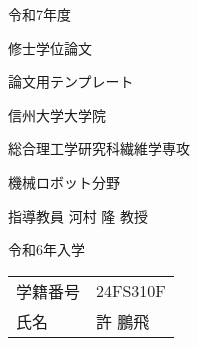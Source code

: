 \documentclass[main]{subfiles}
\begin{document}
\begin{titlepage}
    \fontsize{30pt}{30pt} \selectfont

    \centering
    令和7年度
    \vspace{15pt}

    修士学位論文
    \vspace{45pt}

    論文用テンプレート
    \vspace{45pt}

    信州大学大学院
    \vspace{20pt}

    総合理工学研究科繊維学専攻
    \vspace{20pt}

    機械ロボット分野
    \vspace{45pt}

    指導教員 河村 隆 教授
    \vspace{45pt}

    令和6年入学
    \vspace{15pt}

    \begin{tabular}{ll}
        学籍番号 & 24FS310F \\
        氏名   & 許 鵬飛 \\
    \end{tabular}
    \normalsize

\end{titlepage}
\end{document}
